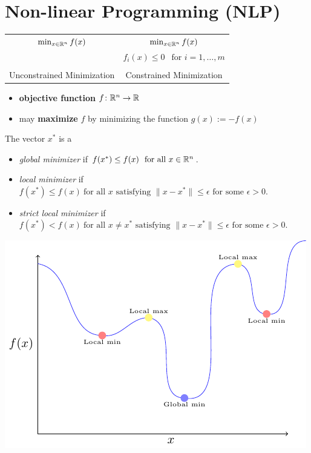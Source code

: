\documentclass[../open-optimization/open-optimization.tex]{subfiles}
\begin{document}
\chapter{Non-linear Programming (NLP)}
\begin{center}
\begin{tabular}{|c|c|}
\hline
$
\min_{x \in {\mathbb{R}}^n} f(x)
$
& 
$\min_{x \in {\mathbb{R}}^n} f(x)$ \\
&$ f_i(x) \leq 0  \ \ \text{ for } i=1, \dots, m$\\
&\\
Unconstrained Minimization & Constrained Minimization\\
\hline
\end{tabular}
\end{center}

\begin{itemize}
\item \textbf{objective function} $f \colon {\mathbb{R}}^n \to {\mathbb{R}}$
\item may \textbf{maximize} $f$ by minimizing the function $g(x) := -f(x)$
\end{itemize}


\begin{definition}
The vector $x^*$ is a
\begin{itemize}
\item  \emph{global minimizer} if $f(x^*) \leq f(x) \ \text{ for all } x \in {\mathbb{R}}^n$.
\item  \emph{local minimizer} if $f(x^*) \leq f(x) \ \text{for all } x \text{ satisfying } \| x- x^*\| \leq \epsilon \text{ for some } \epsilon > 0$.
\item \emph{strict local minimizer} if $f(x^*) < f(x) \ \text{for all } x \neq x^* \text{ satisfying } \| x- x^*\| \leq \epsilon \text{ for some } \epsilon > 0$.
\end{itemize}
\end{definition}

\includegraphics[scale = 1]{local-min}
\end{document}
